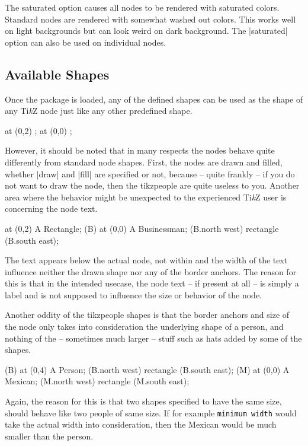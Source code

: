 \documentclass{ltxdoc}
\newcommand{\tikzname}{Ti\emph{k}Z\xspace}
\newcommand{\DescribeOption}[1]{\leavevmode
	\marginpar{\raggedleft\strut\MacroFont\string #1\ }}
\begin{document}
	\DescribeOption{saturated}
	The \textsf{saturated} option causes all nodes to be rendered with saturated colors.
	Standard nodes are rendered with somewhat washed out colors.
	This works well on light backgrounds but can look weird on dark background.
	The |saturated| option can also be used on individual nodes.
	
\subsection{Available Shapes}
	Once the package is loaded, any of the defined shapes can be used as the shape of any \tikzname node just like any other predefined shape.
	\begin{codeexample}{3cm}
\node[draw,rectangle,minimum size=1.5cm] at (0,2) {};
\node[businessman,minimum size=1.5cm] at (0,0) {};
	\end{codeexample}
	However, it should be noted that in many respects the nodes behave quite differently from standard node shapes.
	First, the nodes are drawn and filled, whether |draw| and |fill| are specified or not, because -- quite frankly -- if you do not want to draw the node, then the \textsf{tikzpeople} are quite useless to you.
	Another area where the behavior might be unexpected to the experienced \tikzname user is concerning the node text.
	\begin{codeexample}{3cm}
\node[draw,rectangle,minimum size=1.5cm] at (0,2) {A Rectangle};
\node[businessman,minimum size=1.5cm] (B) at (0,0) {A Businessman};
 (B.north west) rectangle (B.south east);
	\end{codeexample}
	The text appears below the actual node, not within and the width of the text influence neither the drawn shape nor any of the border anchors.
	The reason for this is that in the intended usecase, the node text -- if present at all -- is simply a label and is not supposed to influence the size or behavior of the node.
	
	Another oddity of the tikzpeople shapes is that the border anchors and size of the node only takes into consideration the underlying shape of a person, and nothing of the -- sometimes much larger -- stuff such as hats added by some of the shapes.
	\begin{codeexample}{3cm}
\node[person,minimum size=1.5cm] (B) at (0,4) {A Person};
 (B.north west) rectangle (B.south east);
\node[mexican,minimum size=1.5cm]     (M) at (0,0) {A Mexican};
 (M.north west) rectangle (M.south east);
	\end{codeexample}
	Again, the reason for this is that two shapes specified to have the same size, should behave like two people of same size.
	If for example \texttt{minimum width} would take the actual width into consideration, then the Mexican would be much smaller than the person.
	
\end{document}

